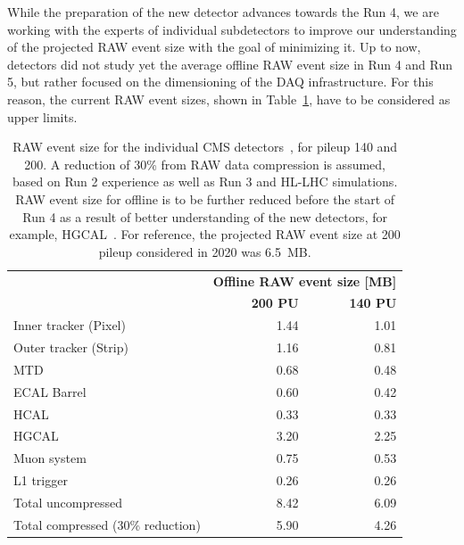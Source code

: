 \documentclass{cmspaper}
\newcommand{\trh}{\cellcolor{tablerowheader}}
\newcommand{\B}[1]{\textbf{#1}}
\newcommand{\UP}[1]{\multirow{-2}{*}{\B{#1}}}
\begin{document}
While the preparation of the new detector advances towards the Run 4, we are working with the experts of individual subdetectors to improve our understanding of the projected RAW event size with the goal of minimizing it. Up to now, detectors did not study yet the average offline RAW event size in Run 4 and Run 5, but rather focused on the dimensioning of the DAQ infrastructure. For this reason, the current RAW event sizes, shown in Table~\ref{tab:raw_size}, have to be considered as upper limits.
\begin{table}[ht]
\begin{center}
\caption{RAW event size for the individual CMS detectors~\cite{CMS-TDR-21-007}, for pileup 140 and 200. A reduction of 30\% from RAW data compression is assumed, based on Run 2 experience as well as Run 3 and HL-LHC simulations. RAW event size for offline is to be further reduced before the start of Run 4 as a result of better understanding of the new detectors, for example, HGCAL~\cite{CERN-LHCC-2017-023}. For reference, the projected RAW event size at 200 pileup considered in 2020 was 6.5~MB.}
\label{tab:raw_size}
\begin{tabular}{lrr} 
\hline
\rowcolor{tableheader}               & \multicolumn{2}{c}{\B{Offline RAW event size [MB]}}\\
\rowcolor{tableheader} \UP{Detector} & \B{200 PU} & \B{140 PU} \\
\hline \hline
\trh Inner tracker (Pixel)           & 1.44 & 1.01  \\
\trh Outer tracker (Strip)           & 1.16 & 0.81  \\
\trh MTD                             & 0.68 & 0.48  \\
\trh ECAL Barrel                     & 0.60 & 0.42  \\
\trh HCAL                            & 0.33 & 0.33  \\
\trh HGCAL                           & 3.20 & 2.25  \\
\trh Muon system                     & 0.75 & 0.53  \\ %
\trh L1 trigger                      & 0.26 & 0.26  \\ \hline\hline
\trh Total uncompressed              & 8.42 & 6.09  \\ \hline
\trh Total compressed (30\% reduction) & 5.90 & 4.26  \\
\hline
\end{tabular}
\end{center}
\end{table}
\end{document}
